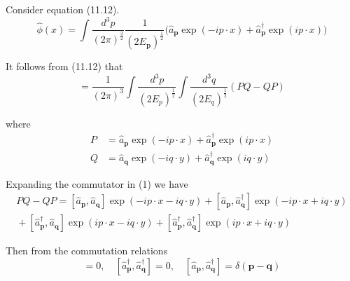 


\bigskip
Consider equation (11.12).
\begin{equation*}
\hat\phi(x)=\int\frac{d^3p}{(2\pi)^\frac{3}{2}}\frac{1}{(2E_{\mathbf p})^\frac{1}{2}}
\big(\hat a_{\mathbf p}\exp(-ip\cdot x)+\hat a_{\mathbf p}^\dag\exp(ip\cdot x)\big)
\tag{11.12}
\end{equation*}

It follows from (11.12) that
\begin{equation*}
[\hat\phi(x),\hat\phi(y)]=\frac{1}{(2\pi)^3}
\int\frac{d^3p}{(2E_p)^\frac{1}{2}}\int\frac{d^3q}{(2E_q)^\frac{1}{2}}(PQ-QP)
\tag{1}
\end{equation*}

where
\begin{align*}
P&=\hat a_{\mathbf p}\exp(-ip\cdot x)+\hat a_{\mathbf p}^\dag\exp(ip\cdot x)
\\
Q&=\hat a_{\mathbf q}\exp(-iq\cdot y)+\hat a_{\mathbf q}^\dag\exp(iq\cdot y)
\end{align*}

Expanding the commutator in (1) we have
\begin{multline*}
PQ-QP=
[\hat a_{\mathbf p},\hat a_{\mathbf q}]\exp(-ip\cdot x-iq\cdot y)
+[\hat a_{\mathbf p},\hat a_{\mathbf q}^\dag]\exp(-ip\cdot x+iq\cdot y)
\\
{}+[\hat a_{\mathbf p}^\dag,\hat a_{\mathbf q}]\exp(ip\cdot x-iq\cdot y)
+[\hat a_{\mathbf p}^\dag,\hat a_{\mathbf q}^\dag]\exp(ip\cdot x+iq\cdot y)
\end{multline*}

Then from the commutation relations
\begin{equation*}
[\hat a_{\mathbf p},\hat a_{\mathbf q}]=0,
\quad
[\hat a_{\mathbf p}^\dag,\hat a_{\mathbf q}^\dag]=0,
\quad
[\hat a_{\mathbf p},\hat a_{\mathbf q}^\dag]=\delta(\mathbf p-\mathbf q)
\end{equation*}

